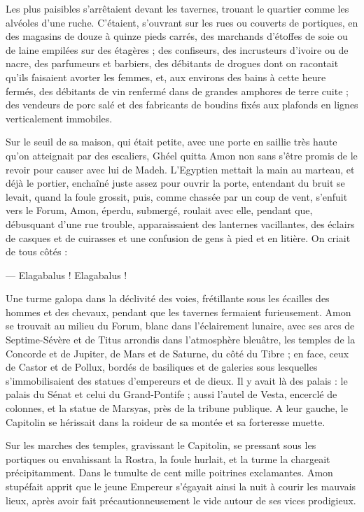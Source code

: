 \documentclass[a4paper, 11pt, oneside, polutonikogreek, french]{article}
\begin{document}
Les plus paisibles s'arrêtaient devant les tavernes, trouant le quartier comme les alvéoles d'une ruche. C'étaient, s'ouvrant sur les rues ou couverts de portiques, en des magasins de douze à quinze pieds carrés, des marchands d'étoffes de soie ou de laine empilées sur des étagères ; des confiseurs, des incrusteurs d'ivoire ou de nacre, des parfumeurs et barbiers, des débitants de drogues dont on racontait qu'ils faisaient avorter les femmes, et, aux environs des bains à cette heure fermés, des débitants de vin renfermé dans de grandes amphores de terre cuite ; des vendeurs de porc salé et des fabricants de boudins fixés aux plafonds en lignes verticalement immobiles.

Sur le seuil de sa maison, qui était petite, avec une porte en saillie très haute qu'on atteignait par des escaliers, Ghéel quitta Amon non sans s'être promis de le revoir pour causer avec lui de Madeh. L'Egyptien mettait la main au marteau, et déjà le portier, enchaîné juste assez pour ouvrir la porte, entendant du bruit se levait, quand la foule grossit, puis, comme chassée par un coup de vent, s'enfuit vers le Forum, Amon, éperdu, submergé, roulait avec elle, pendant que, débusquant d'une rue trouble, apparaissaient des lanternes vacillantes, des éclairs de casques et de cuirasses et une confusion de gens à pied et en litière. On criait de tous côtés :

--- Elagabalus ! Elagabalus !

Une turme galopa dans la déclivité des voies, frétillante sous les écailles des hommes et des chevaux, pendant que les tavernes fermaient furieusement. Amon se trouvait au milieu du Forum, blanc dans l'éclairement lunaire, avec ses arcs de Septime-Sévère et de Titus arrondis dans l'atmosphère bleuâtre, les temples de la Concorde et de Jupiter, de Mars et de Saturne, du côté du Tibre ; en face, ceux de Castor et de Pollux, bordés de basiliques et de galeries sous lesquelles s'immobilisaient des statues d'empereurs et de dieux. Il y avait là des palais : le palais du Sénat et celui du Grand-Pontife ; aussi l'autel de Vesta, encerclé de colonnes, et la statue de Marsyas, près de la tribune publique. A leur gauche, le Capitolin se hérissait dans la roideur de sa montée et sa forteresse muette.

Sur les marches des temples, gravissant le Capitolin, se pressant sous les portiques ou envahissant la Rostra, la foule hurlait, et la turme la chargeait précipitamment. Dans le tumulte de cent mille poitrines exclamantes. Amon stupéfait apprit que le jeune Empereur s'égayait ainsi la nuit à courir les mauvais lieux, après avoir fait précautionneusement le vide autour de ses vices prodigieux.
\end{document}
